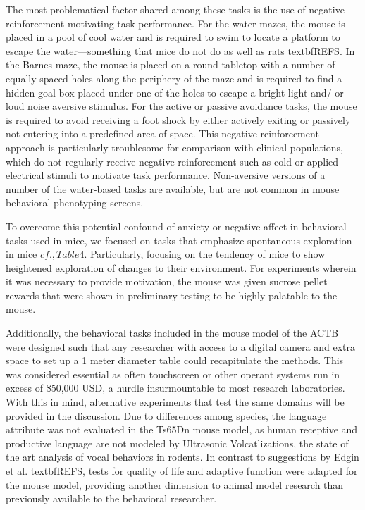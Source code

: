 \documentclass{article}
\begin{document}
The most problematical factor shared among these tasks is the use of negative reinforcement motivating task performance. For the water mazes, the mouse is placed in a pool of cool water and is required to swim to locate a platform to escape the water—something that mice do not do as well as rats textbf{REFS}. In the Barnes maze, the mouse is placed on a round tabletop with a number of equally-spaced holes along the periphery of the maze and is required to find a hidden goal box placed under one of the holes to escape a bright light and/ or loud noise aversive stimulus. For the active or passive avoidance tasks, the mouse is required to avoid receiving a foot shock by either actively exiting or passively not entering into a predefined area of space. This negative reinforcement approach is particularly troublesome for comparison with clinical populations, which do not regularly receive negative reinforcement such as cold or applied electrical stimuli to motivate task performance. Non-aversive versions of a number of the water-based tasks are available, but are not common in mouse behavioral phenotyping screens.

To overcome this potential confound of anxiety or negative affect in behavioral tasks used in mice, we focused on tasks that emphasize spontaneous exploration in mice \(cf., Table 4\). Particularly, focusing on the tendency of mice to show heightened exploration of changes to their environment. For experiments wherein it was necessary to provide motivation, the mouse was given sucrose pellet rewards that were shown in preliminary testing to be highly palatable to the mouse.

Additionally, the behavioral tasks included in the mouse model of the ACTB were designed such that any researcher with access to a digital camera and extra space to set up a 1 meter diameter table could recapitulate the methods. This was considered essential as often touchscreen or other operant systems run in excess of \$50,000 USD, a hurdle insurmountable to most research laboratories. With this in mind, alternative experiments that test the same domains will be provided in the discussion. Due to differences among species, the language attribute was not evaluated in the Ts65Dn mouse model, as human receptive and productive language are not modeled by Ultrasonic Volcatlizations, the state of the art analysis of vocal behaviors in rodents. In contrast to suggestions by Edgin et al. textbf{REFS}, tests for quality of life and adaptive function were adapted for the mouse model, providing another dimension to animal model research than previously available to the behavioral researcher.
\end{document}
